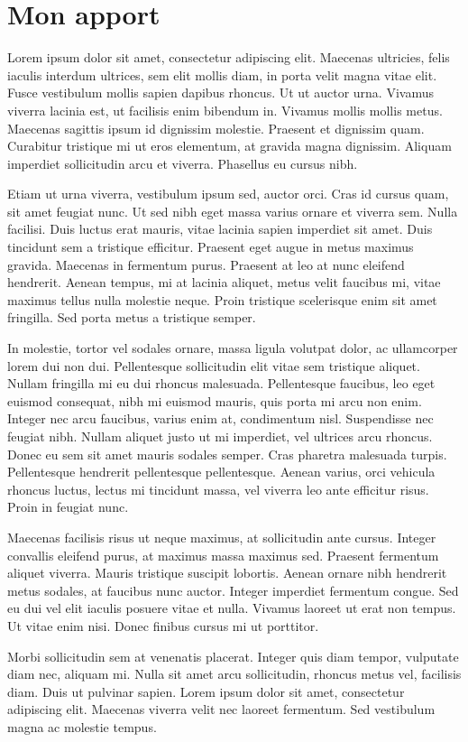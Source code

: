\chapter{Mon apport}



Lorem ipsum dolor sit amet, consectetur adipiscing elit. Maecenas ultricies, felis iaculis interdum ultrices, sem elit mollis diam, in porta velit magna vitae elit. Fusce vestibulum mollis sapien dapibus rhoncus. Ut ut auctor urna. Vivamus viverra lacinia est, ut facilisis enim bibendum in. Vivamus mollis mollis metus. Maecenas sagittis ipsum id dignissim molestie. Praesent et dignissim quam. Curabitur tristique mi ut eros elementum, at gravida magna dignissim. Aliquam imperdiet sollicitudin arcu et viverra. Phasellus eu cursus nibh.

Etiam ut urna viverra, vestibulum ipsum sed, auctor orci. Cras id cursus quam, sit amet feugiat nunc. Ut sed nibh eget massa varius ornare et viverra sem. Nulla facilisi. Duis luctus erat mauris, vitae lacinia sapien imperdiet sit amet. Duis tincidunt sem a tristique efficitur. Praesent eget augue in metus maximus gravida. Maecenas in fermentum purus. Praesent at leo at nunc eleifend hendrerit. Aenean tempus, mi at lacinia aliquet, metus velit faucibus mi, vitae maximus tellus nulla molestie neque. Proin tristique scelerisque enim sit amet fringilla. Sed porta metus a tristique semper.

In molestie, tortor vel sodales ornare, massa ligula volutpat dolor, ac ullamcorper lorem dui non dui. Pellentesque sollicitudin elit vitae sem tristique aliquet. Nullam fringilla mi eu dui rhoncus malesuada. Pellentesque faucibus, leo eget euismod consequat, nibh mi euismod mauris, quis porta mi arcu non enim. Integer nec arcu faucibus, varius enim at, condimentum nisl. Suspendisse nec feugiat nibh. Nullam aliquet justo ut mi imperdiet, vel ultrices arcu rhoncus. Donec eu sem sit amet mauris sodales semper. Cras pharetra malesuada turpis. Pellentesque hendrerit pellentesque pellentesque. Aenean varius, orci vehicula rhoncus luctus, lectus mi tincidunt massa, vel viverra leo ante efficitur risus. Proin in feugiat nunc.

Maecenas facilisis risus ut neque maximus, at sollicitudin ante cursus. Integer convallis eleifend purus, at maximus massa maximus sed. Praesent fermentum aliquet viverra. Mauris tristique suscipit lobortis. Aenean ornare nibh hendrerit metus sodales, at faucibus nunc auctor. Integer imperdiet fermentum congue. Sed eu dui vel elit iaculis posuere vitae et nulla. Vivamus laoreet ut erat non tempus. Ut vitae enim nisi. Donec finibus cursus mi ut porttitor.

Morbi sollicitudin sem at venenatis placerat. Integer quis diam tempor, vulputate diam nec, aliquam mi. Nulla sit amet arcu sollicitudin, rhoncus metus vel, facilisis diam. Duis ut pulvinar sapien. Lorem ipsum dolor sit amet, consectetur adipiscing elit. Maecenas viverra velit nec laoreet fermentum. Sed vestibulum magna ac molestie tempus. 
